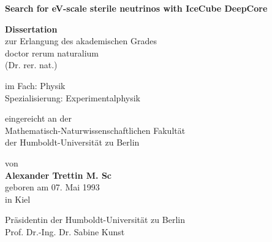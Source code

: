\documentclass[
a4paper, %
fontsize=10pt, %
twoside=true, %
numbers=noenddot, %
]{kaobook}
\begin{document}
\frontmatter %

\begin{titlepage}
	\begin{center}
	\vspace*{1cm}

	\LARGE
	\textbf{Search for eV-scale sterile neutrinos with IceCube DeepCore}
	\large

	\vspace{0.8cm}

	\textbf{Dissertation}\\
	zur Erlangung des akademischen Grades\\
	doctor rerum naturalium \\
	(Dr. rer. nat.) \\

	\vspace{0.5cm}

	im Fach: Physik \\
	Spezialisierung: Experimentalphysik\\

	\vspace{0.5cm}

	eingereicht an der \\
	Mathematisch-Naturwissenschaftlichen Fakultät\\
	der Humboldt-Universität zu Berlin\\

	\vspace{0.5cm}

	von\\
	\textbf{Alexander Trettin M. Sc}\\
	geboren am 07. Mai 1993\\
	in Kiel

	\vspace{0.5cm}

	Präsidentin der Humboldt-Universität zu Berlin\\
	Prof. Dr.-Ing. Dr. Sabine Kunst\\

	\vspace{0.5cm}


\end{center}
\end{titlepage}
\end{document}
